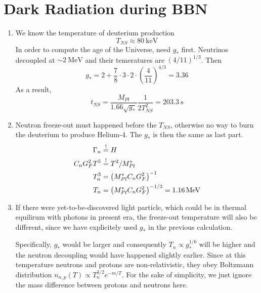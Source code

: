 \section{Dark Radiation during BBN}
\begin{enumerate}[label=\alph*)]
   \item We know the temperature of deuterium production 
      \begin{equation*}
         T_{NS} \approx \SI{80}{\kilo\eV}
      \end{equation*}
      In order to compute the age of the Universe, need $g_*$ first. Neutrinos decoupled at $\sim \SI{2}{\mega\eV}$ and their temeratures are $(4/11)^{1/3}$. Then
      \begin{equation}
         g_* = 2 + \frac{7}{8} \cdot 3 \cdot 2 \cdot \left( \frac{4}{11} \right)^{4/3} = 3.36
      \end{equation}
      As a result,
      \begin{equation}
         t_{NS} = \frac{M_{Pl}}{1.66\sqrt{g_*}} \frac{1}{2 T^2_{NS}} = \SI{203.3}{\s}
      \end{equation}
   \item Neutron freeze-out must happened before the $T_{NS}$, otherwise no way to burn the deuterium to produce Helium-4. The $g_*$ is then the same as last part.
      \begin{align}
         \Gamma_n &\stackrel{!}{=} H \notag \\
         C_n G_F^2 T^5 &\stackrel{!}{=} T^2 / M_{Pl}^* \notag \\
         T_n^3 &= \left(M_{Pl}^* C_n G_F^2 \right)^{-1} \notag \\
         T_n &= \left(M_{Pl}^* C_n G_F^2 \right)^{-1/3} = \SI{1.16}{\mega\eV}
      \end{align}
   \item
      If there were yet-to-be-discovered light particle, which could be in thermal equilirum with photons in present era, the freeze-out temperature will also be different, since we have explicitely used $g_*$ in the previous calculation. 

      Specifically, $g_*$ would be larger and consequently $T_n \propto g_*^{1/6}$ will be higher and the neutron decoupling would have happened slightly earlier. Since at this temperature neutrons and protons are non-relativistic, they obey Boltzmann distribution $n_{n,p}(T) \propto T_n^{3/2} e^{-m/T}$. For the sake of simplicity, we just ignore the mass difference between protons and neutrons here.       


\end{enumerate}
